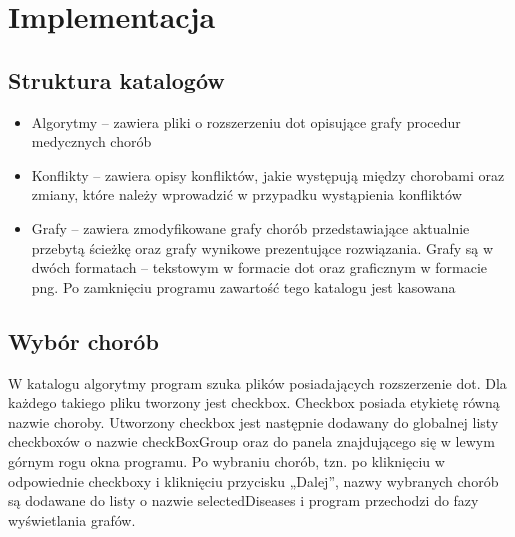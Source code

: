 \chapter{Implementacja}

 
\section{Struktura katalogów}

\begin{itemize}
\item{Algorytmy – zawiera pliki o rozszerzeniu dot opisujące grafy procedur medycznych chorób}
\item{Konflikty – zawiera opisy konfliktów, jakie występują między chorobami oraz zmiany, które należy wprowadzić w przypadku wystąpienia konfliktów}
\item{Grafy – zawiera zmodyfikowane grafy chorób przedstawiające aktualnie przebytą ścieżkę oraz grafy wynikowe prezentujące rozwiązania. Grafy są w dwóch formatach – tekstowym w formacie dot oraz graficznym w formacie png. 
Po zamknięciu programu zawartość tego katalogu jest kasowana}
\end{itemize}

\section{Wybór chorób}

W katalogu algorytmy program szuka plików posiadających rozszerzenie dot. Dla każdego takiego pliku tworzony jest checkbox. Checkbox posiada etykietę równą nazwie choroby. 
Utworzony checkbox jest następnie dodawany do globalnej listy checkboxów o nazwie checkBoxGroup oraz do panela znajdującego się w lewym górnym rogu okna programu. Po wybraniu chorób, tzn. po kliknięciu w odpowiednie checkboxy i kliknięciu przycisku „Dalej”, nazwy wybranych chorób są dodawane do listy o nazwie selectedDiseases i program przechodzi do fazy wyświetlania grafów. 

